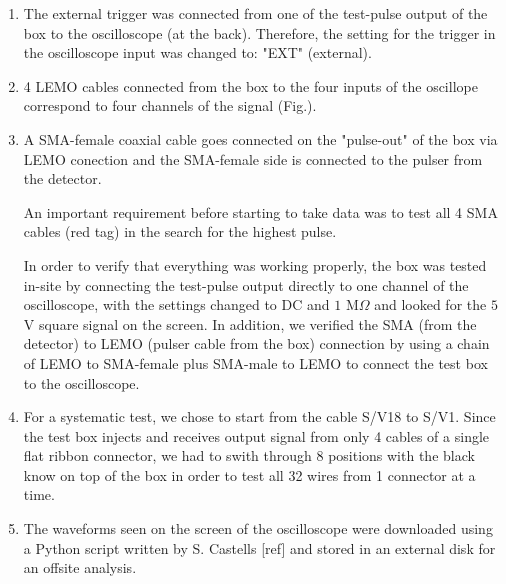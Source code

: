 \begin{enumerate}
\item The external trigger was connected from one of the test-pulse output of the box to the oscilloscope (at the back). Therefore, the setting for the trigger in the oscilloscope input was changed to: "EXT" (external).

\item 4 LEMO cables connected from the box to the four inputs of the oscillope correspond to four channels of the signal (Fig.).

\item A SMA-female coaxial cable goes connected on the "pulse-out" of the box via LEMO conection and the SMA-female side is connected to the pulser from the detector.

An important requirement before starting to take data was to test all 4 SMA cables (red tag) in the search for the highest pulse.

In order to verify that everything was working properly, the box was tested in-site by connecting the test-pulse output directly to one channel of the oscilloscope, with the settings changed to DC and $1$ M$\Omega $ and looked for the $5$ V square signal on the screen. In addition, we verified the SMA (from the detector) to LEMO (pulser cable from the box) connection by using a chain of LEMO to SMA-female plus SMA-male to LEMO to connect the test box to the oscilloscope.

\item For a systematic test, we chose to start from the cable S/V18 to S/V1. Since the test box injects and receives output signal from only 4 cables of a single flat ribbon connector, we had to swith through 8 positions with the black know on top of the box in order to test all 32 wires from 1 connector at a time. 

\item The waveforms seen on the screen of the oscilloscope were downloaded using a Python script written by S. Castells [ref] and stored in an external disk for an offsite analysis. 



\end{enumerate}

